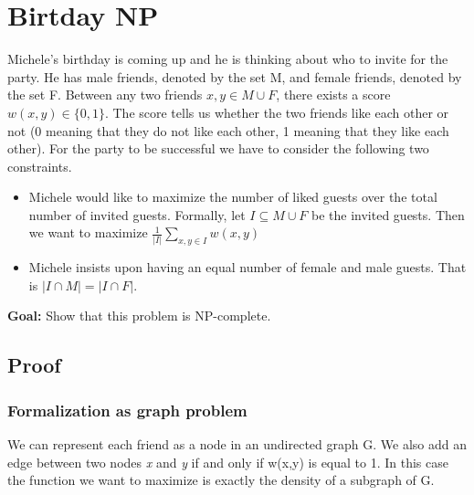 \section{Birtday NP}
Michele's birthday is coming up and he is thinking about who to invite for the party. He has male friends, denoted by the set M, and female friends, denoted by the set F.
Between any two friends $x, y \in M \cup F$, there exists a score $w(x, y) \in \{0, 1\}$. The score tells us whether the two friends like each other or not (0 meaning that they do not like each other, 1 meaning that they like each other). For the party to be successful we have to consider the
following two constraints.
\begin{itemize}
	\item Michele would like to maximize the number of liked guests over the total number of
	invited guests. Formally, let $I \subseteq M \cup F$ be the invited guests. Then we want to maximize
	$\frac{1}{|I|} \sum_{x,y \in I} w(x,y)$
	\item Michele insists upon having an equal number of female and male guests. That is $|I \cap M| =
	|I \cap F|$.
\end{itemize}
\textbf{Goal:} Show that this problem is NP-complete.

\subsection{Proof}
\subsubsection{Formalization as graph problem}
We can represent each friend as a node in an undirected graph G. We also add an edge between two nodes \textit{x} and \textit{y} if and only if w(x,y) is equal to 1. In this case the function we want to maximize is exactly the density \cite{Dense subgraph} of a subgraph of G.

